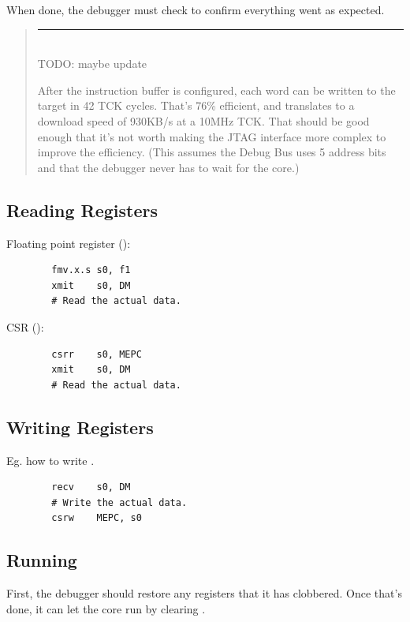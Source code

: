 \documentclass{article}
\newenvironment{commentary}
{
   \begin{quotation}
   \noindent
   \small \em
   \rule{\linewidth}{1pt}\\
}
{
   \end{quotation}
}
\begin{document}
When done, the debugger must check \Fdoverflow to confirm everything went as
expected.

\begin{commentary}

    TODO: maybe update

    After the instruction buffer is configured, each word can be written to the
    target in 42 TCK cycles. That's 76\% efficient, and translates to a
    download speed of 930KB/s at a 10MHz TCK.  That should be good enough that
    it's not worth making the JTAG interface more complex to improve the
    efficiency. (This assumes the Debug Bus uses 5 address bits and that the
    debugger never has to wait for the core.)
\end{commentary}

\subsection{Reading Registers}

Floating point register (\Fone):
\begin{verbatim}
        fmv.x.s s0, f1
        xmit    s0, DM
        # Read the actual data.
\end{verbatim}

CSR (\Rmepc):
\begin{verbatim}
        csrr    s0, MEPC
        xmit    s0, DM
        # Read the actual data.
\end{verbatim}

\subsection{Writing Registers} \label{writereg}

Eg. how to write \Rmepc.
\begin{verbatim}
        recv    s0, DM
        # Write the actual data.
        csrw    MEPC, s0
\end{verbatim}

\subsection{Running}

First, the debugger should restore any registers that it has clobbered.  Once
that's done, it can let the core run by clearing \Fhalt.
\end{document}
